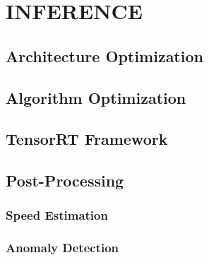 \chapter{INFERENCE}

\renewcommand{\headrulewidth}{0.5pt}
\renewcommand{\footrulewidth}{0.5pt}
\thispagestyle{plain}
\pagestyle{fancy}
\fancyhf{}
\raggedright
{}

\section{Architecture Optimization}

\section{Algorithm Optimization}

\section{TensorRT Framework}

\section{Post-Processing}

    \subsection{Speed Estimation}

    \subsection{Anomaly Detection}
